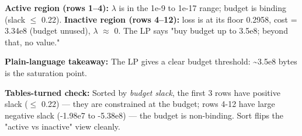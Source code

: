 \documentclass{article}
\begin{document}
\begin{table}[H]
  \centering
  \small
\end{table}


\textbf{Active region (rows 1--4):} \ensuremath{\lambda} is in the 1e-9 to 1e-17 range; budget is binding (slack \ensuremath{\leq} 0.22). \textbf{Inactive region (rows 4--12):} loss is at its floor 0.2958, cost = 3.34e8 (budget unused), \ensuremath{\lambda} \ensuremath{\approx} 0. The LP says "buy budget up to 3.5e8; beyond that, no value."


\textbf{Plain-language takeaway:} The LP gives a clear budget threshold: \textasciitilde{}3.5e8 bytes is the saturation point.


\textbf{Tables-turned check:} Sorted by \emph{budget slack}, the first 3 rows have positive slack (\ensuremath{\leq} 0.22) --- they are constrained at the budget; rows 4-12 have large negative slack (-1.98e7 to -5.38e8) --- the budget is non-binding. Sort flips the "active vs inactive" view cleanly.
\end{document}
